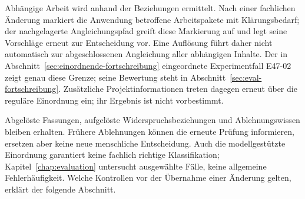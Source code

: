 Abhängige Arbeit wird anhand der Beziehungen ermittelt. Nach einer
fachlichen Änderung markiert die Anwendung betroffene Arbeitspakete
mit Klärungsbedarf; der nachgelagerte Angleichungspfad greift diese
Markierung auf und legt seine Vorschläge erneut zur Entscheidung vor.
Eine Auflösung führt daher nicht automatisch zur abgeschlossenen
Angleichung aller abhängigen Inhalte. Der in
Abschnitt~\ref{sec:einordnende-fortschreibung} eingeordnete
Experimentfall E47-02 zeigt genau diese Grenze; seine Bewertung
steht in Abschnitt~\ref{sec:eval-fortschreibung}. Zusätzliche
Projektinformationen treten dagegen erneut über die reguläre
Einordnung ein; ihr Ergebnis ist nicht vorbestimmt.

Abgelöste Fassungen, aufgelöste Widerspruchsbeziehungen und
Ablehnungswissen bleiben erhalten. Frühere Ablehnungen können die
erneute Prüfung informieren, ersetzen aber keine neue menschliche
Entscheidung. Auch die modellgestützte Einordnung garantiert keine
fachlich richtige Klassifikation; Kapitel~\ref{chap:evaluation}
untersucht ausgewählte Fälle, keine allgemeine Fehlerhäufigkeit.
Welche Kontrollen vor der Übernahme einer Änderung gelten,
erklärt der folgende Abschnitt.
